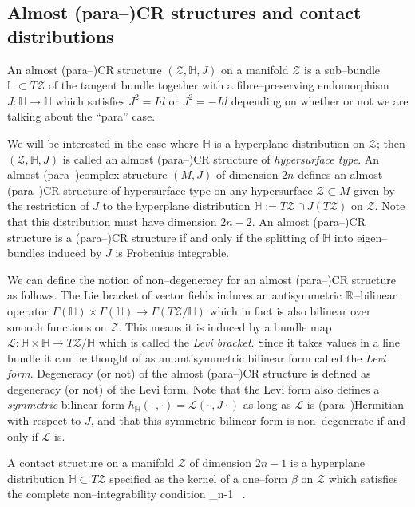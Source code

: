 \subsection{Almost (para--)CR structures and contact distributions}

\begin{defi}
An almost (para--)CR structure $(\mathcal{Z},\mathbb{H} ,J)$ on a manifold $\mathcal{Z}$ is a sub--bundle $\mathbb{H} \subset T\mathcal{Z}$ of the tangent bundle together with a fibre--preserving endomorphism $J:\mathbb{H} \rightarrow \mathbb{H} $ which satisfies $J^2=Id$ or $J^2=-Id$ depending on whether or not we are talking about the ``para'' case.
\end{defi}

We will be interested in the case where $ \mathbb{H} $ is a hyperplane distribution on $\mathcal{Z}$; then $(\mathcal{Z}, \mathbb{H} ,J)$ is called an almost (para--)CR structure of \textit{hypersurface type}. An almost (para--)complex structure $(M,J)$ of dimension $2n$ defines an almost (para--)CR structure of hypersurface type on any hypersurface $\mathcal{Z}\subset M$ given by the restriction of $J$ to the hyperplane distribution $ \mathbb{H} :=T\mathcal{Z}\cap J(T\mathcal{Z})$ on $\mathcal{Z}$. Note that this distribution must have dimension $2n-2$. An almost (para--)CR structure is a (para--)CR structure if and only if the splitting of $ \mathbb{H} $ into eigen--bundles induced by $J$ is Frobenius integrable.

We can define the notion of non--degeneracy for an almost (para--)CR structure as follows. The Lie bracket of vector fields induces an antisymmetric $\mathbb{R}$--bilinear operator $\Gamma( \mathbb{H} )\times\Gamma( \mathbb{H} )\rightarrow\Gamma(T\mathcal{Z}/ \mathbb{H} )$ which in fact is also bilinear over smooth functions on $\mathcal{Z}$. This means it is induced by a bundle map $\mathcal{L}: \mathbb{H} \times \mathbb{H} \rightarrow T\mathcal{Z}/ \mathbb{H} $ which is called the \textit{Levi bracket}. Since it takes values in a line bundle it can be thought of as an antisymmetric bilinear form called the \textit{Levi form}. Degeneracy (or not) of the almost (para--)CR structure is defined as degeneracy (or not) of the Levi form. Note that the Levi form also defines a \textit{symmetric} bilinear form $h_\mathbb{H}(\cdot\,,\cdot)=\mathcal{L}(\cdot\,,J\cdot)$ as long as $\mathcal{L}$ is (para--)Hermitian with respect to $J$, and that this symmetric bilinear form is non--degenerate if and only if $\mathcal{L}$ is.

\begin{defi}
A contact structure on a manifold $\mathcal{Z}$ of dimension $2n-1$ is a hyperplane distribution $ \mathbb{H} \subset T\mathcal{Z}$ specified as the kernel of a one--form $\beta$ on $\mathcal{Z}$ which satisfies the complete non--integrability condition
\be \label{eq:non_integrability}
\beta\wedge {}_{n-1\ } .
\ee
\end{defi}

